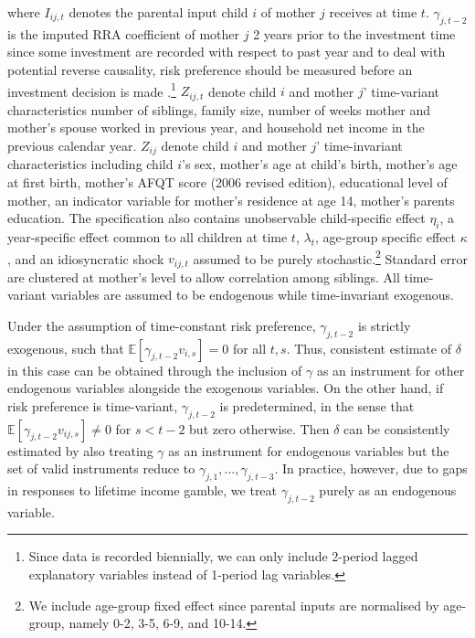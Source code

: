 \documentclass[emulatestandardclasses, 10pt, abstract = true]{scrartcl}
\begin{document}
where $I_{ij,t}$ denotes the parental input child $i$ of mother $j$ receives at time $t$. $\gamma_{j,t-2}$ is the imputed RRA coefficient of mother $j$ 2 years prior to the investment time since some investment are recorded with respect to past year and to deal with potential reverse causality, risk preference should be measured before an investment decision is made \citet{hartog2002linking}.\footnote{Since data is recorded biennially, we can only include 2-period lagged explanatory variables instead of 1-period lag variables.} $Z_{ij,t}$ denote child $i$ and mother $j$' time-variant characteristics number of siblings, family size, number of weeks mother and mother's spouse worked in previous year, and household net income in the previous calendar year. $Z_{ij}$ denote child $i$ and mother $j$' time-invariant characteristics including child $i$'s sex, mother's age at child's birth, mother's age at first birth, mother's AFQT score (2006 revised edition), educational level of mother, an indicator variable for mother's residence at age 14, mother's parents education. The specification also contains unobservable child-specific effect $\eta_i$, a year-specific effect common to all children at time $t$, $\lambda_t$, age-group specific effect $\kappa$, and an idiosyncratic shock $v_{ij,t}$ assumed to be purely stochastic.\footnote{We include age-group fixed effect since parental inputs are normalised by age-group, namely 0-2, 3-5, 6-9, and 10-14.} Standard error are clustered at mother's level to allow correlation among siblings. All time-variant variables are assumed to be endogenous while time-invariant exogenous.

Under the assumption of time-constant risk preference, $\gamma_{j,t-2}$ is strictly exogenous, such that $\mathbb E[\gamma_{j,t-2}v_{i,s}]=0$ for all $t,s$. Thus, consistent estimate of $\delta$ in this case can be obtained through the inclusion of $\gamma$ as an instrument for other endogenous variables alongside the exogenous variables. On the other hand, if risk preference is time-variant, $\gamma_{j,t-2}$ is predetermined, in the sense that $\mathbb E[\gamma_{j,t-2}v_{ij,s}]\ne 0$ for $s<t-2$ but zero otherwise. \alert{Then $\delta$ can be consistently estimated by also treating $\gamma$ as an instrument for endogenous variables but the set of valid instruments reduce to $\gamma_{j,1},...,\gamma_{j,t-3}$.} In practice, however, due to gaps in responses to lifetime income gamble, we treat $\gamma_{j,t-2}$ purely as an endogenous variable.
\end{document}
